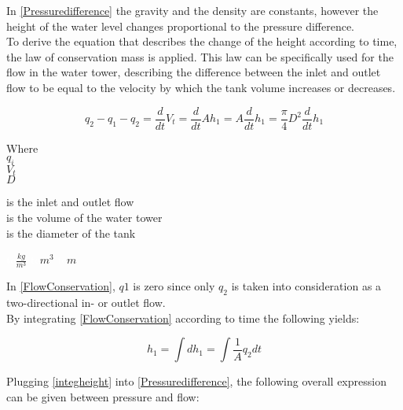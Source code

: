 In \eqref{Pressuredifference} the gravity and the density are constants, however the height of the water level changes proportional to the pressure difference. 
\\
To derive the equation that describes the change of the height according to 
time, the law of conservation mass is applied. This law can be specifically used for the flow in the water tower, describing the difference between the inlet and outlet flow to be equal to the velocity by which the tank volume increases or decreases. 

\begin{equation}
  q_{2} - q_{1} - q_2 = \frac{d}{dt}V_t = \frac{d}{dt}Ah_1 = A \frac{d}{dt}h_1 = \frac{\pi}{4} D^2 \frac{d}{dt} h_1
  \label{FlowConservation}
\end{equation}

\begin{minipage}[t]{0.20\textwidth}
Where\\
\hspace*{8mm} $q_i$ \\
\hspace*{8mm} $V_t$ \\
\hspace*{8mm} $D$ 
\end{minipage}
\begin{minipage}[t]{0.68\textwidth}
\vspace*{2mm}
is the inlet and outlet flow\\
is the volume of the water tower\\
is the diameter of the tank 
\end{minipage}
\begin{minipage}[t]{0.10\textwidth}
\vspace*{2mm}
\textcolor{White}{te}$\unit{\frac{kg}{m^3}}$
\textcolor{White}{te}$\unit{m^3}$
\textcolor{White}{te}$\unit{m}$
\end{minipage}

In \eqref{FlowConservation}, $q1$ is zero since only $q_2$ is taken into consideration as a two-directional in- or outlet flow. 
\\
By integrating \eqref{FlowConservation} according to time the following yields:

\begin{equation}
 h_1 = \int dh_1 = \int \frac{1}{A} q_2 dt
  \label{integheight}
\end{equation}

Plugging \eqref{integheight} into \eqref{Pressuredifference}, the following overall expression can be given between pressure and flow: 

